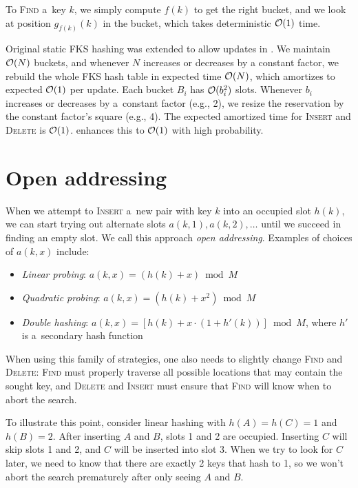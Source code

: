 To \textsc{Find} a~key $k$, we simply compute $f(k)$ to get the right bucket,
and we look at position $g_{f(k)}(k)$ in the bucket, which takes deterministic
$\mathcal{O}(1)$ time.

Original static FKS hashing was extended to allow updates in
\cite{dyn-ph-bounds}.
We maintain $\mathcal{O}(N)$ buckets, and whenever $N$ increases or decreases by
a constant factor, we rebuild the whole FKS hash table in expected time
$\mathcal{O}(N)$, which amortizes to expected $\mathcal{O}(1)$ per update. Each bucket $B_i$
has $\mathcal{O}(b_i^2)$ slots. Whenever $b_i$ increases or decreases by a~constant
factor (e.g., 2), we resize the reservation by the constant factor's square
(e.g., 4).
The expected amortized time for \textsc{Insert} and \textsc{Delete} is $\mathcal{O}(1)$.
\cite{univ-class-of-hfns} enhances this to $\mathcal{O}(1)$ with high probability.

\section{Open addressing}
\label{sec:open-addressing}
When we attempt to \textsc{Insert} a~new pair with key $k$ into an occupied slot
$h(k)$, we can start trying out alternate slots $a(k,1), a(k,2), \ldots$
until we succeed in finding an empty slot. We call this approach \emph{open
addressing}. Examples of choices of $a(k,x)$ include:
\begin{itemize}
\item \emph{Linear probing}: $a(k,x)=(h(k)+x) \bmod M$
\item \emph{Quadratic probing}: $a(k,x)=(h(k)+x^2) \bmod M$
\item \emph{Double hashing}: $a(k,x)=[h(k)+x\cdot (1+h'(k))]\bmod M$, where
$h'$ is a~secondary hash function
\end{itemize}

When using this family of strategies, one also needs to slightly change
\textsc{Find} and \textsc{Delete}: \textsc{Find} must properly traverse
all possible locations that may contain the sought key, and \textsc{Delete}
and \textsc{Insert} must ensure that \textsc{Find} will know when to abort
the search.

To illustrate this point, consider linear hashing with $h(A)=h(C)=1$ and
$h(B)=2$. After inserting $A$ and $B$, slots 1 and 2 are occupied.
Inserting $C$ will skip slots 1 and 2, and $C$ will be inserted into slot 3.
When we try to look for $C$ later, we need to know that there are exactly 2 keys
that hash to 1, so we won't abort the search prematurely after only seeing
$A$ and $B$.


